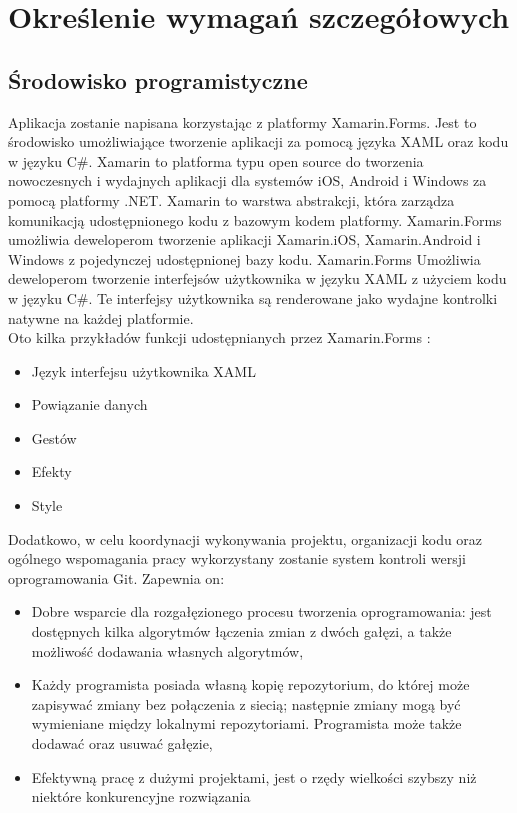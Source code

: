 \newpage
\section{Określenie wymagań szczegółowych}		%

\subsection{Środowisko programistyczne}  %

\hspace{1.2cm}Aplikacja zostanie napisana korzystając z platformy Xamarin.Forms. Jest to środowisko umożliwiające tworzenie aplikacji za pomocą języka XAML oraz kodu w języku C\#.
Xamarin to platforma typu open source do tworzenia nowoczesnych i wydajnych aplikacji dla systemów iOS, Android i Windows za pomocą platformy .NET. Xamarin to warstwa abstrakcji, która zarządza komunikacją udostępnionego kodu z bazowym kodem platformy. Xamarin.Forms umożliwia deweloperom tworzenie aplikacji Xamarin.iOS, Xamarin.Android i Windows z pojedynczej udostępnionej bazy kodu. Xamarin.Forms Umożliwia deweloperom tworzenie interfejsów użytkownika w języku XAML z użyciem kodu w języku C\#. Te interfejsy użytkownika są renderowane jako wydajne kontrolki natywne na każdej platformie. \\ Oto kilka przykładów funkcji udostępnianych przez Xamarin.Forms :

\begin{itemize}
	\item Język interfejsu użytkownika XAML
	\item Powiązanie danych
	\item Gestów
	\item Efekty
	\item Style
\end{itemize}

\hspace{0.60cm}Dodatkowo, w celu koordynacji wykonywania projektu, organizacji kodu oraz ogólnego wspomagania pracy wykorzystany zostanie system kontroli wersji oprogramowania Git. Zapewnia on:

\begin{itemize}
	\item Dobre wsparcie dla rozgałęzionego procesu tworzenia oprogramowania: jest dostępnych kilka algorytmów łączenia zmian z dwóch gałęzi, a także możliwość dodawania własnych algorytmów,
	\item Każdy programista posiada własną kopię repozytorium, do której może zapisywać zmiany bez połączenia z siecią; następnie zmiany mogą być wymieniane między lokalnymi repozytoriami. Programista może także dodawać oraz usuwać gałęzie, 
	\item Efektywną pracę z dużymi projektami, jest o rzędy wielkości szybszy niż niektóre konkurencyjne rozwiązania
\end{itemize}

